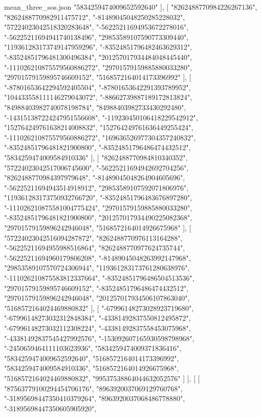 \begin{filecontents*}[overwrite]{mean_three_sos.json}
    "5834259474009652592640"
   ],
   [
    "8262488770984226267136",
    "8262488770982911475712",
    "-81489045048250285228032",
    "57224023042518320283648",
    "-56225211694953672278016",
    "-56225211694941740138496",
    "29853589107590773309440",
    "119361283173749147959296",
    "-83524851796482463629312",
    "-83524851796481300496384",
    "201257017934484048445440",
    "-111026210875579560886272",
    "29701579159885880033280",
    "29701579159895746609152",
    "5168572164014173396992"
   ],
   [
    "-87801653642294592405504",
    "-87801653642291393789952",
    "104433558111146279043072",
    "-88662739887189172813824",
    "84988403982740078198784",
    "84988403982733430292480",
    "-143151387224247951556608",
    "-119230450106418229542912",
    "152764249761638214008832",
    "152764249761636449255424",
    "-111026210875579560886272",
    "169636526977304357240832",
    "-83524851796481821900800",
    "-83524851796486474432512",
    "5834259474009584910336"
   ],
   [
    "8262488770984810340352",
    "57224023042517006745600",
    "-56225211694942692704256",
    "8262488770984397979648",
    "-81489045048264904605696",
    "-56225211694943514918912",
    "29853589107592071806976",
    "119361283173750932766720",
    "-83524851796483676897280",
    "-111026210875581004775424",
    "29701579159885880033280",
    "-83524851796481821900800",
    "201257017934490225082368",
    "29701579159896242946048",
    "5168572164014926675968"
   ],
   [
    "57224023042516094287872",
    "8262488770976113164288",
    "-56225211694955988516864",
    "8262488770977624735744",
    "-56225211694960179806208",
    "-81489045048263992147968",
    "29853589107570724306944",
    "119361283173761280638976",
    "-111026210875583812337664",
    "-83524851796486504513536",
    "29701579159895746609152",
    "-83524851796486474432512",
    "29701579159896242946048",
    "201257017934506107863040",
    "5168572164024469880832"
   ],
   [
    "-67996148273028923719680",
    "-67996148273032312848384",
    "-43381492837550812495872",
    "-67996148273032112308224",
    "-43381492837558453075968",
    "-43381492837545427992576",
    "-153092607165930598798968",
    "-2450659464111103623936",
    "5834259474009371836416",
    "5834259474009652592640",
    "5168572164014173396992",
    "5834259474009584910336",
    "5168572164014926675968",
    "5168572164024469880832",
    "99537538864044632052576"
   ]
  ],
  [
   [
    "87563779100294454706176",
    "8963920037069129760768",
    "-31895698447350410379264",
    "8963920037068486778880",
    "-31895698447350605905920",

\end{filecontents*}
